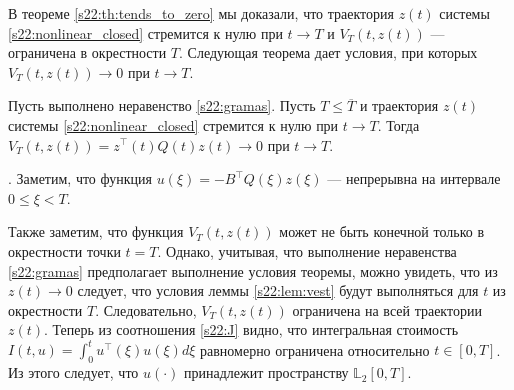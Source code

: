 \documentclass[../main.tex]{subfiles}
\begin{document}
В теореме \ref{s22:th:tends_to_zero} мы доказали, что траектория $z(t)$ системы \eqref{s22:nonlinear_closed} стремится к нулю при $t\to T$ и $V_{T}(t,z(t))$ --- ограничена в окрестности $T$. 
Следующая теорема дает условия, при которых $V_{T}(t,z(t))\to 0$ при $t\to T$.
\begin{theorem}
 Пусть выполнено неравенство \eqref{s22:gramas}. 
Пусть $T \leqslant \overline{T}$ и траектория $z(t)$ системы \eqref{s22:nonlinear_closed} стремится к нулю при $t\to T$. 
Тогда $V_{T}(t,z(t)) =z^{\top}(t)Q(t)z(t) \to 0$ при $t \to T$.
\end{theorem}
\doc. 
Заметим, что функция $ u(\xi) = -B^{\top} Q(\xi) z(\xi)$ --- непрерывна на интервале $0 \leqslant \xi <T$. 

Также заметим, что функция $V_{T}(t,z(t))$ может не быть конечной только в окрестности точки $t = T$. 
Однако, учитывая, что выполнение неравенства \eqref{s22:gramas} предполагает выполнение условия теоремы, можно увидеть, что из $z(t)\to 0 $ следует, что условия леммы \ref{s22:lem:vest} будут выполняться для $t$ из окрестности $T$.
Следовательно, $V_{T}(t,z(t))$ ограничена на всей траектории $z(t)$. 
Теперь из соотношения \eqref{s22:J} видно, что интегральная стоимость $I(t,u) = \int_{0}^{t} u^{\top}(\xi)u(\xi) d\xi$ равномерно ограничена относительно $t \in [0,T]$. 
Из этого следует, что $u(\cdot)$ принадлежит пространству $\mathbb L_2[0,T]$. 
 
\end{document}

